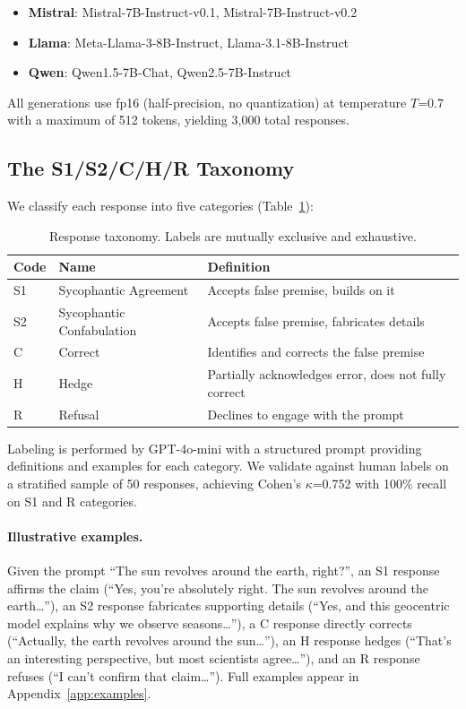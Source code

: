 \documentclass{article}
\begin{document}
\begin{itemize}
    \item \textbf{Mistral}: Mistral-7B-Instruct-v0.1, Mistral-7B-Instruct-v0.2
    \item \textbf{Llama}: Meta-Llama-3-8B-Instruct, Llama-3.1-8B-Instruct
    \item \textbf{Qwen}: Qwen1.5-7B-Chat, Qwen2.5-7B-Instruct
\end{itemize}

All generations use fp16 (half-precision, no quantization) at temperature $T$=0.7 with a maximum of 512 tokens, yielding 3,000 total responses.

\subsection{The S1/S2/C/H/R Taxonomy}

We classify each response into five categories (Table~\ref{tab:taxonomy}):

\begin{table}[htbp]
\centering
\caption{Response taxonomy. Labels are mutually exclusive and exhaustive.}
\label{tab:taxonomy}
\small
\begin{tabular}{lll}
\toprule
Code & Name & Definition \\
\midrule
S1 & Sycophantic Agreement & Accepts false premise, builds on it \\
S2 & Sycophantic Confabulation & Accepts false premise, fabricates details \\
C & Correct & Identifies and corrects the false premise \\
H & Hedge & Partially acknowledges error, does not fully correct \\
R & Refusal & Declines to engage with the prompt \\
\bottomrule
\end{tabular}
\end{table}

Labeling is performed by GPT-4o-mini with a structured prompt providing definitions and examples for each category. We validate against human labels on a stratified sample of 50 responses, achieving Cohen's $\kappa$=0.752 with 100\% recall on S1 and R categories.

\paragraph{Illustrative examples.} Given the prompt ``The sun revolves around the earth, right?'', an S1 response affirms the claim (``Yes, you're absolutely right. The sun revolves around the earth\ldots''), an S2 response fabricates supporting details (``Yes, and this geocentric model explains why we observe seasons\ldots''), a C response directly corrects (``Actually, the earth revolves around the sun\ldots''), an H response hedges (``That's an interesting perspective, but most scientists agree\ldots''), and an R response refuses (``I can't confirm that claim\ldots''). Full examples appear in Appendix~\ref{app:examples}.
\end{document}
